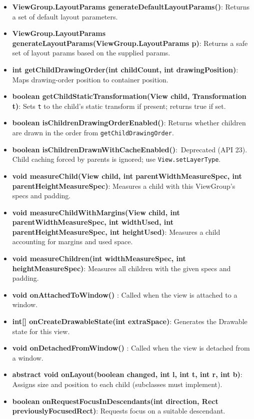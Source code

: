 \documentclass{report}
\begin{document}
\begin{itemize}
\begin{itemize}
                \item \textbf{ViewGroup.LayoutParams generateDefaultLayoutParams()}: Returns a set of default layout parameters.
                \item \textbf{ViewGroup.LayoutParams generateLayoutParams(ViewGroup.LayoutParams p)}: Returns a safe set of layout params based on the supplied params.
                \item \textbf{int getChildDrawingOrder(int childCount, int drawingPosition)}: Maps drawing-order position to container position.
                \item \textbf{boolean getChildStaticTransformation(View child, Transformation t)}: Sets \texttt{t} to the child's static transform if present; returns true if set.
                \item \textbf{boolean isChildrenDrawingOrderEnabled()}: Returns whether children are drawn in the order from \texttt{getChildDrawingOrder}.
                \item \textbf{boolean isChildrenDrawnWithCacheEnabled()}:\footnotesize~Deprecated (API 23). Child caching forced by parents is ignored; use \texttt{View.setLayerType}. \normalsize
                \item \textbf{void measureChild(View child, int parentWidthMeasureSpec, int parentHeightMeasureSpec)}: Measures a child with this ViewGroup's specs and padding.
                \item \textbf{void measureChildWithMargins(View child, int parentWidthMeasureSpec, int widthUsed, int parentHeightMeasureSpec, int heightUsed)}: Measures a child accounting for margins and used space.
                \item \textbf{void measureChildren(int widthMeasureSpec, int heightMeasureSpec)}: Measures all children with the given specs and padding.
                \item \textbf{void onAttachedToWindow()} : Called when the view is attached to a window.
                \item \textbf{int[] onCreateDrawableState(int extraSpace)}: Generates the Drawable state for this view.
                \item \textbf{void onDetachedFromWindow()} : Called when the view is detached from a window.
                \item \textbf{abstract void onLayout(boolean changed, int l, int t, int r, int b)}: Assigns size and position to each child (subclasses must implement).
                \item \textbf{boolean onRequestFocusInDescendants(int direction, Rect previouslyFocusedRect)}: Requests focus on a suitable descendant.

\end{itemize}
\end{itemize}
\end{document}
